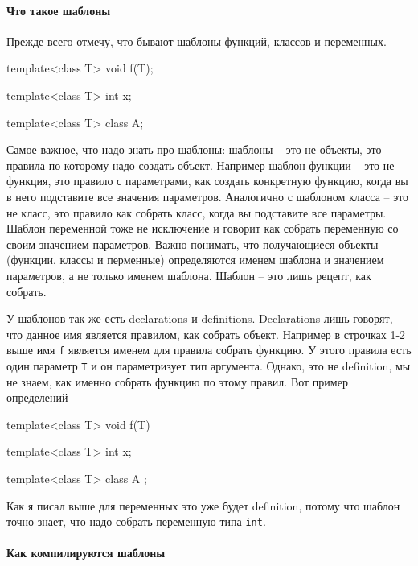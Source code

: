 \paragraph{Что такое шаблоны}
Прежде всего отмечу, что бывают шаблоны функций, классов и переменных.
\begin{cppcode}
template<class T>
void f(T);

template<class T>
int x;

template<class T>
class A;
\end{cppcode}
Самое важное, что надо знать про шаблоны: шаблоны -- это не объекты, это правила по которому надо создать объект.
Например шаблон функции -- это не функция, это правило с параметрами, как создать конкретную функцию, когда вы в него подставите все значения параметров.
Аналогично с шаблоном класса -- это не класс, это правило как собрать класс, когда вы подставите все параметры.
Шаблон переменной тоже не исключение и говорит как собрать переменную со своим значением параметров.
Важно понимать, что получающиеся объекты (функции, классы и перменные) определяются именем шаблона и значением параметров, а не только именем шаблона.
Шаблон -- это лишь рецепт, как собрать.

У шаблонов так же есть declarations и definitions.
Declarations лишь говорят, что данное имя является правилом, как собрать объект.
Например в строчках 1-2 выше имя \verb"f" является именем для правила собрать функцию.
У этого правила есть один параметр \verb"T" и он параметризует тип аргумента.
Однако, это не definition, мы не знаем, как именно собрать функцию по этому правил.
Вот пример определений
\begin{cppcode}
template<class T>
void f(T) {}

template<class T>
int x;

template<class T>
class A {};
\end{cppcode}
Как я писал выше для переменных это уже будет definition, потому что шаблон точно знает, что надо собрать переменную типа \verb"int".

\paragraph{Как компилируются шаблоны}

